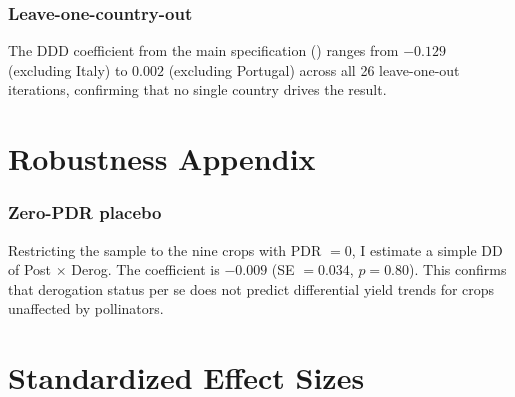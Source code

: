 \documentclass[12pt]{article}
\begin{document}
\subsubsection*{Leave-one-country-out} The DDD coefficient from the main specification () ranges from $-0.129$ (excluding Italy) to $0.002$ (excluding Portugal) across all 26 leave-one-out iterations, confirming that no single country drives the result.

\section{Robustness Appendix}

\subsubsection*{Zero-PDR placebo} Restricting the sample to the nine crops with PDR $= 0$, I estimate a simple DD of Post $\times$ Derog. The coefficient is $-0.009$ (SE $= 0.034$, $p = 0.80$). This confirms that derogation status per se does not predict differential yield trends for crops unaffected by pollinators.

\section{Standardized Effect Sizes}
\label{sec:sde}


\end{document}
